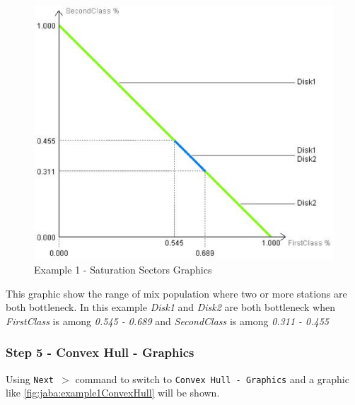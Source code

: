 \begin{figure}[htbp]
    \begin{center}
        \includegraphics[scale=.5]{img/jaba/example1SatSector}
    \end{center}
    \caption{Example 1 - Saturation Sectors Graphics}
    \label{fig:jaba:example1SatSector}
\end{figure}

This graphic show the range of mix population where two or more stations are both bottleneck.
In this example \textit{Disk1} and \textit{Disk2} are both bottleneck when \textit{FirstClass} is among 
\textit{0.545 - 0.689} and \textit{SecondClass} is among \textit{0.311 - 0.455}

\subsubsection{Step 5 - Convex Hull - Graphics}
Using \texttt{Next $>$} command to switch to \texttt{Convex Hull - Graphics} and a graphic like \autoref{fig:jaba:example1ConvexHull} will be shown.

